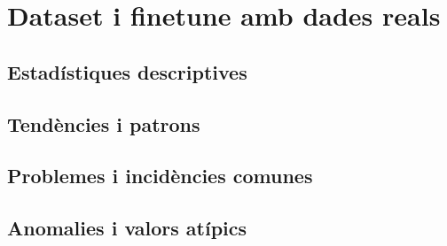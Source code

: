 \section{Dataset i finetune amb dades reals}

\subsection{Estadístiques descriptives}
\subsection{Tendències i patrons}
\subsection{Problemes i incidències comunes}
\subsection{Anomalies i valors atípics}
